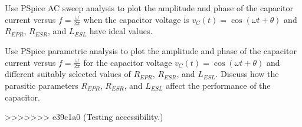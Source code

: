 \documentclass[11pt]{article}
\begin{document}
\begin{question}
    \begin{subquestion}{Use PSpice AC sweep analysis to plot the amplitude and phase of the capacitor current versus $f=\frac{\omega}{2\pi}$ when the capacitor voltage is $v_C(t)=\cos(\omega t+\theta)$ and $R_{EPR}$, $R_{ESR}$, and $L_{ESL}$ have ideal values.}
        \answer{}
    \end{subquestion}

    \begin{subquestion}{Use PSpice parametric analysis to plot the amplitude and phase of the capacitor current versus $f=\frac{\omega}{2\pi}$ for the capacitor voltage $v_C(t)=\cos(\omega t+\theta)$ and different suitably selected values of $R_{EPR}$, $R_{ESR}$, and $L_{ESL}$. Discuss how the parasitic parameters $R_{EPR}$, $R_{ESR}$, and $L_{ESL}$ affect the performance of the capacitor. }
        \answer{}
    \end{subquestion}
>>>>>>> e39c1a0 (Testing accessibility.)

\end{question}

\end{document}
